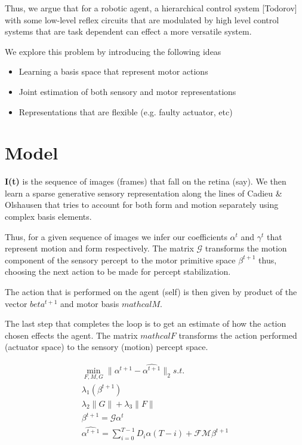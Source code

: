 \documentclass[conference]{IEEEtran}
\begin{document}
Thus, we argue that for a robotic agent, a hierarchical control system [Todorov] with some low-level reflex circuits that are modulated by high level control systems that are task dependent can effect a more versatile system.

We explore this problem by introducing the following ideas 
\begin{itemize}
\item Learning a basis space that represent motor actions 
\item Joint estimation of both sensory and motor representations
\item Representations that are flexible (e.g. faulty actuator, etc)
\end{itemize}


\section{Model}
\textbf{I(t)} is the sequence of images (frames) that fall on the retina (say). We then learn a sparse generative sensory representation along the lines of Cadieu \& Olshausen  \cite{cadieu2012learning} that tries to account for both form and motion separately using complex basis elements.

Thus, for a given sequence of images we infer our coefficients $\alpha^{t}$ and $\gamma^{t}$ that represent motion and form respectively. The matrix $\mathcal{G}$ transforms the motion component of the sensory percept to the motor primitive space $\beta^{t+1}$ thus, choosing the next action to be made for percept stabilization. 

The action that is performed on the agent (self) is then given by product of the vector $beta^{t+1}$ and motor basis $mathcal{M}$. 

The last step that completes the loop is to get an estimate of how the action chosen effects the agent. The matrix $mathcal{F}$ transforms the action performed (actuator space) to the sensory (motion) percept space.

\begin{eqnarray}
\min_{F,M,G} \| \alpha^{t+1} - \hat{\alpha^{t+1}} \|_{2} \textit{s.t.} \\ \lambda_1(\beta^{t+1})  \\
 \lambda_2\|G\| + \lambda_3\|F\| \\
\beta^{t+1} = \mathcal{G} \alpha^{t}\\
\hat{\alpha^{t+1}} = \sum_{i=0}^{T-1} D_{i} \alpha(T-i) + \mathcal{F}\mathcal{M}\beta^{t+1} \\
\end{eqnarray}
\end{document}

